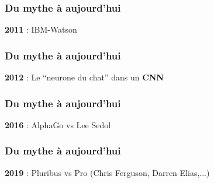 \documentclass{formation}
\begin{document}
\begin{frame}
  \frametitle{Du mythe à aujourd'hui}
  \textbf{2011} : IBM-Watson
\end{frame}

\begin{frame}
  \frametitle{Du mythe à aujourd'hui}
  \textbf{2012} : Le ``neurone du chat'' dans un \textbf{CNN}
\end{frame}

\begin{frame}
  \frametitle{Du mythe à aujourd'hui}
  \textbf{2016} : AlphaGo vs Lee Sedol
\end{frame}

\begin{frame}
  \frametitle{Du mythe à aujourd'hui}
  \textbf{2019} : Pluribus vs Pro (Chris Ferguson, Darren Elias,...)
\end{frame}
\end{document}
